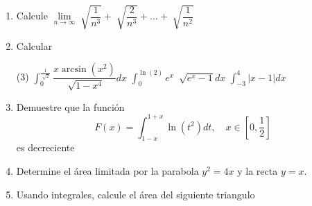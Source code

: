 \documentclass[12pt]{article}
\newenvironment{preguntas}
{\begin{enumerate}\itemsep12pt
	}
	{
	\end{enumerate}
}
\newcommand{\ra}{\rightarrow}
\begin{document}
\begin{preguntas}
\item Calcule $\lim\limits_{n \ra \infty} \sqrt[]{\dfrac{1}{n^3}} + \sqrt[]{\dfrac{2}{n^3}} + \dots  + \sqrt[]{\dfrac{1}{n^2}}$
\item Calcular
\begin{tasks}(3)
\task $\displaystyle\int_0^{\frac{1}{\sqrt[]{2}}} \dfrac{x \arcsin(x^2)}{\sqrt[]{1-x^4}}dx$
\task $\displaystyle\int_0^{\ln(2)} e^x\ \sqrt[]{e^x-1}dx$
\task $\displaystyle\int_{-3}^{4} |x-1|dx$
\end{tasks}
\item Demuestre que la función
$$F(x) = \displaystyle\int_{1-x}^{1+x} \ln(t^2)dt, \quad x \in [0, \frac{1}{2}]$$
es decreciente
\item Determine el área limitada por la parabola $y^2=4x$ y la recta $y=x$.
\item Usando integrales, calcule el área del siguiente triangulo
	\begin{center}
	\end{center}
\end{preguntas}
\end{document}
